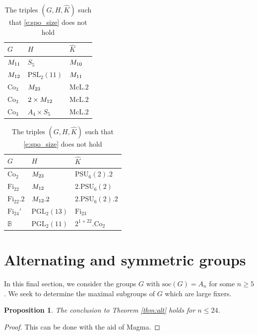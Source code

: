 \documentclass[twoside,a4paper,reqno,11pt]{amsart}
\newcommand{\<}{\langle}
\renewcommand{\>}{\rangle}
\newcommand{\leqs}{\leqslant}
\newcommand{\geqs}{\geqslant}
\newcommand{\soc}{\mathrm{soc}}
\newcommand{\PSL}{\mathrm{PSL}}
\newcommand{\PGL}{\mathrm{PGL}}
\newcommand{\PSU}{\mathrm{PSU}}
\def\Ma{{\rm M}}
\newtheorem{prop}[thm]{Proposition}
\theoremstyle{definition}
\begin{document}
	{\small
		\begin{table}[h!]
			\begin{tabular}{@{}lll@{}}
				\toprule
				$G$ & $H$ & $\widehat{K}$ \\ \midrule
				$\Ma_{11}$&$S_5$&$\Ma_{10}$\\
				$\Ma_{12}$&$\PSL_2(11)$&$\Ma_{11}$\\
				$\mathrm{Co}_3$&$\Ma_{23}$&$\mathrm{McL}.2$\\
				$\mathrm{Co}_3$&$2\times \Ma_{12}$&$\mathrm{McL}.2$\\
				$\mathrm{Co}_3$&$A_4\times S_5$&$\mathrm{McL}.2$\\
				\bottomrule
			\end{tabular}
			\begin{tabular}{@{}lll@{}}
				\toprule
				$G$ & $H$ & $\widehat{K}$ \\ \midrule
				$\mathrm{Co}_2$&$\Ma_{23}$&$\PSU_6(2).2$\\
				$\mathrm{Fi}_{22}$&$\Ma_{12}$&$2.\PSU_6(2)$\\
				$\mathrm{Fi}_{22}.2$&$\Ma_{12}.2$&$2.\PSU_6(2).2$\\
				$\mathrm{Fi}_{24}'$&$\PGL_2(13)$&$\mathrm{Fi}_{23}$\\
				$\mathbb{B}$&$\PGL_2(11)$&$2^{1+22}.\mathrm{Co}_2$\\
				\bottomrule
			\end{tabular}
			\caption{The triples $(G,H,\widehat{K})$ such that \eqref{e:spo_size} does not hold} \label{tab:spo_size}
		\end{table}
	}
	
	
	\section{Alternating and symmetric groups}
	
	
	\label{s:max}
	
	
	
	
	
	In this final section, we consider the groups $G$ with $\soc(G) = A_n$ for some $n\geqs 5$. We seek to determine the maximal subgroups of $G$ which are large fixers.
	
	\begin{prop}
		\label{p:max_An_24}
		The conclusion to Theorem \ref{thm:alt} holds for $n\leqs 24$.
	\end{prop}
	
	\begin{proof}
		This can be done with the aid of {\sc Magma}.
	\end{proof}
	
\end{document}
